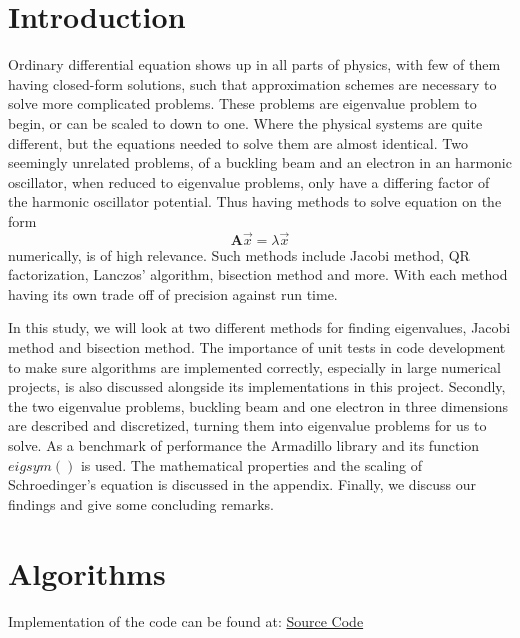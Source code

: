 \documentclass[%
reprint,
nofootinbib,
amsmath,amssymb,
aps,
]{revtex4-1}
\begin{document}
\section{Introduction}%
Ordinary differential equation shows up in all parts of physics, with few of them having closed-form solutions, such that approximation schemes are necessary to solve more complicated problems.  These problems are eigenvalue problem to begin, or can be scaled to down to one. Where the physical systems are quite different, but the equations needed to solve them are almost identical. Two seemingly unrelated problems, of a buckling beam and an electron in an harmonic oscillator, when reduced to eigenvalue problems, only have a differing factor of the harmonic oscillator potential. Thus having methods to solve equation on the form 
\begin{equation}
	\mathbf{A} \vec{x} = \lambda \vec{x}
\end{equation}
numerically, is of high relevance. Such methods include Jacobi method, QR factorization, Lanczos' algorithm, bisection method and more. With each method having its own trade off of precision against run time. 

In this study, we will look at two different methods for finding eigenvalues, Jacobi method\cite{GoluVanlJM} and bisection method\cite{barth1967calculation}. The importance of unit tests in code development to make sure algorithms are implemented correctly, especially in large numerical projects, is also discussed alongside its implementations in this project. Secondly, the two eigenvalue problems, buckling beam and one electron in three dimensions are described and discretized, turning them into eigenvalue problems for us to solve. As a benchmark of performance  the Armadillo library and its function $eigsym()$ is used. The mathematical properties and the scaling of Schroedinger's equation is discussed in the appendix. Finally, we discuss our findings and give some concluding remarks.
\section{Algorithms}%
Implementation of the code can be found at: \href{https://github.com/SigurdSundberg/FYS3150/tree/master/project2/code/cpp_codes}{Source Code}
\end{document}
